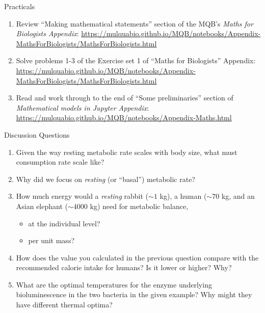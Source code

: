 \begin{frame}{Practicals}
  
  \begin{enumerate}\setlength{\itemindent}{-2em}\itemsep2pt

    \item Review ``Making mathematical statements'' section of the MQB's \emph{Maths for Biologists Appendix}: \url{https://mulquabio.github.io/MQB/notebooks/Appendix-MathsForBiologists/MathsForBiologists.html}
    
    \item Solve problems 1-3 of the Exercise set 1 of ``Maths for Biologists'' Appendix: \url{https://mulquabio.github.io/MQB/notebooks/Appendix-MathsForBiologists/MathsForBiologists.html}
    
    \item Read and work through to the end of ``Some preliminaries'' section of \emph{Mathematical models in Jupyter Appendix}: \url{https://mulquabio.github.io/MQB/notebooks/Appendix-Maths.html}
  \end{enumerate}
  
\end{frame}

\begin{frame}{Discussion Questions}

  \begin{enumerate}\setlength{\itemindent}{-2em}\itemsep3pt
  
    \item Given the way resting metabolic rate scales with body size, what must consumption rate scale like?
    
    \item Why did we focus on {\it resting} (or ``basal'') metabolic rate?

    \item How much energy would a {\it resting} rabbit ($\sim 1$ kg), a human ($\sim 70$ kg, and an Asian elephant ($\sim 4000$ kg) need for metabolic balance\footnotemark,
    \begin{itemize}
      \item at the individual level?
      \item per unit mass?
    \end{itemize}

    \item How does the value you calculated in the previous question compare with the recommended calorie intake for humans? Is it lower or higher? Why?  

    \item What are the optimal temperatures for the enzyme underlying bioluminescence in the two bacteria in the given example? Why might they have different thermal optima? 

  \end{enumerate}
  
\end{frame}


